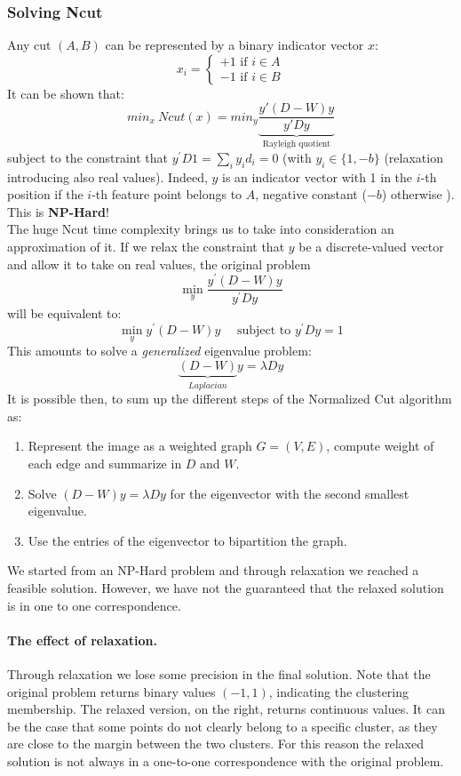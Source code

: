 \subsubsection{Solving Ncut} 
Any cut $(A,B)$ can be represented by a binary indicator vector $x$:
$$x_i = \begin{cases}
+1 \text{  if } i \in A\\
-1 \text{  if } i \in B
\end{cases}$$
It can be shown that:
$$min_x ~ Ncut(x) = min_y \underbrace{\frac{y'(D-W)y}{y'Dy}}_{\text{Rayleigh quotient}}$$
subject to the constraint that $y ^ { \prime } D1 = \sum_{i} y_{i} d _ { i } = 0$ (with $y _ { i } \in \{ 1 , - b \}$ (relaxation introducing also real values). Indeed, $y$ is an indicator vector with 1 in the $i$-th position if the $i$-th feature point belongs to $A$, negative constant ($-b$) otherwise ). This is \textbf{NP-Hard}!\\
The huge Ncut time complexity brings us to take into consideration an approximation of it. If we relax the constraint that $y$ be a discrete-valued vector and allow it to take on real values, the original problem
$$\min _ { y } \frac { y ^ { \prime } ( D - W ) y } { y ^ { \prime } D y }$$
will be equivalent to:
$$\min _ { y } y ^ { \prime } ( D - W ) y \quad \text { subject to } y ^ { \prime } D y = 1$$
This amounts to solve a \textit{generalized} eigenvalue problem:
$$\underbrace{(D-W)}_{Laplacian}y=\lambda D y$$
It is possible then, to sum up the different steps of the Normalized Cut algorithm as:
\begin{enumerate}
	\item Represent the image as a weighted graph $G = (V,E)$, compute weight of each edge and summarize in $D$ and $W$.
	\item Solve $(D-W)y = \lambda Dy$ for the eigenvector with the second smallest eigenvalue.
	\item Use the entries of the eigenvector to bipartition the graph.
\end{enumerate}
We started from an NP-Hard problem and through relaxation we reached a feasible solution. However, we have not the guaranteed that the relaxed solution is in one to one correspondence.

\paragraph*{The effect of relaxation.} Through relaxation we lose some precision in the final solution. 
Note that the original problem returns binary values $(-1,1)$, indicating the clustering membership. The relaxed version, on the right, returns continuous values. It can be the case that some points do not clearly belong to a specific cluster, as they are close to the margin between the two clusters. For this reason the relaxed solution is not always in a one-to-one correspondence with the original problem.

